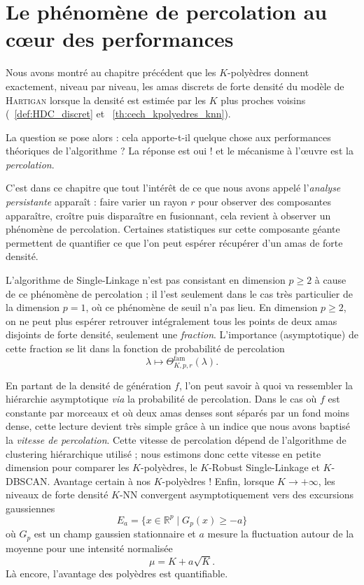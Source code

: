 \chapter{Le phénomène de percolation au c\oe{}ur des performances}
\label{sec:chap_percolation}

Nous avons montré au chapitre précédent que les $K$-polyèdres donnent exactement, niveau par niveau, les amas discrets de forte densité du modèle de \textsc{Hartigan} lorsque la densité est estimée par les $K$ plus proches voisins (\Def~\ref{def:HDC_discret} et \Th~\ref{th:cech_kpolyedres_knn}). 

La question se pose alors : cela apporte-t-il quelque chose aux performances théoriques de l'algorithme ?
La réponse est oui ! et le mécanisme à l'œuvre est la \emph{percolation}. 

C'est dans ce chapitre que tout l'intérêt de ce que nous avons appelé l'\emph{analyse persistante} apparaît : faire varier un rayon $r$ pour observer des composantes apparaître, croître puis disparaître en fusionnant, cela revient à observer un phénomène de percolation. Certaines statistiques sur cette composante géante permettent de quantifier ce que l'on peut espérer récupérer d'un amas de forte densité.

L'algorithme de Single-Linkage n'est pas consistant en dimension $p \ge 2$ à cause de ce phénomène de percolation ; il l'est seulement dans le cas très particulier de la dimension $p=1$, où ce phénomène de seuil n'a pas lieu. En dimension $p \ge 2$, on ne peut plus espérer retrouver intégralement tous les points de deux amas disjoints de forte densité, seulement une \emph{fraction}. L'importance (asymptotique) de cette fraction se lit dans la fonction de probabilité de percolation
\[
    \lambda\longmapsto \Theta^{\mathrm{fam}}_{K,p,r}(\lambda).
\]

En partant de la densité de génération $f$, l'on peut savoir à quoi va ressembler la hiérarchie asymptotique \emph{via} la probabilité de percolation. Dans le cas où $f$ est constante par morceaux et où deux amas denses sont séparés par un fond moins dense, cette lecture devient très simple grâce à un indice que nous avons baptisé la \emph{vitesse de percolation}.
Cette vitesse de percolation dépend de l'algorithme de clustering hiérarchique utilisé ; nous estimons donc cette vitesse en petite dimension pour comparer les $K$-polyèdres, le $K$-Robust Single-Linkage et $K$-DBSCAN.
Avantage certain à nos $K$-polyèdres !
Enfin, lorsque $K\to+\infty$, les niveaux de forte densité $K$-NN convergent asymptotiquement vers des excursions gaussiennes
\[
    E_a=\{x\in\mathbb R^p\mid G_p(x)\ge -a\}
\]
où $G_p$ est un champ gaussien stationnaire et $a$ mesure la fluctuation autour de la moyenne pour une intensité normalisée
\[
    \mu = K+a\sqrt K.
\]
Là encore, l'avantage des polyèdres est quantifiable.


